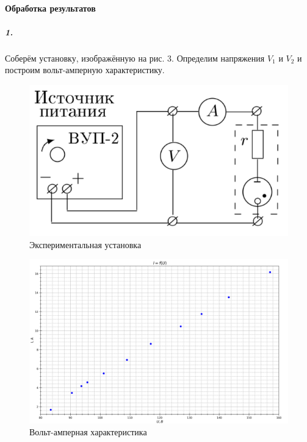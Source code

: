 \documentclass[a4paper,12pt]{article}
\begin{document}
\paragraph{Обработка результатов}
\subparagraph{1.} Соберём установку, изображённую на рис. 3. Определим напряжения $V_1$ и $V_2$ и построим вольт-амперную характеристику.
\begin{figure}[!h]
\centering
\includegraphics[width=0.6\linewidth]{установка(1).png}
\caption{Экспериментальная установка}
\label{fig:mpr}
\end{figure}

\newpage

\begin{figure}[!h]
\centering
\includegraphics[width=0.6\linewidth]{ВАХ.png}
\caption{Вольт-амперная характеристика}
\label{fig:mpr}
\end{figure}
\end{document}
